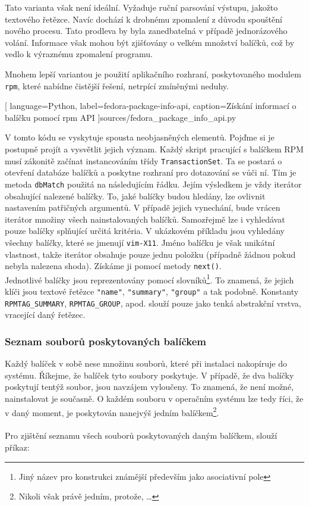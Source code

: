 \documentclass[
  field=inf,
  biblatex,
  glossaries,
  index
]{kidiplom}
\begin{document}
		Tato varianta však není ideální. Vyžaduje ruční parsování výstupu, jakožto textového řetězce. Navíc dochází k drobnému zpomalení z důvodu spouštění nového procesu. Tato prodleva by byla zanedbatelná v případě jednorázového volání. Informace však mohou být zjišťovány o velkém množství balíčků, což by vedlo k výraznému zpomalení programu.

		Mnohem lepší variantou je použití aplikačního rozhraní, poskytovaného modulem \texttt{rpm}, které nabídne čistější řešení, netrpící zmíněnými neduhy.

		\newpage
		
		[
			language=Python,
			label=fedora-package-info-api,
			caption={Získání informací o balíčku pomocí rpm API}
		]{sources/fedora_package_info_api.py}

		V tomto kódu se vyskytuje spousta neobjasněných elementů. Pojďme si je postupně projít a vysvětlit jejich význam. Každý skript pracující s balíčkem RPM musí zákonitě začínat instancováním třídy \texttt{TransactionSet}. Ta se postará o otevření databáze balíčků a poskytne rozhraní pro dotazování se vůči ní. Tím je metoda \texttt{dbMatch} použitá na následujícím řádku. Jejím výsledkem je vždy iterátor obsahující nalezené balíčky. To, jaké balíčky budou hledány, lze ovlivnit nastavením patřičných argumentů. V případě jejich vynechání, bude vrácen iterátor množiny všech nainstalovaných balíčků. Samozřejmě lze i vyhledávat pouze balíčky splňující určitá kritéria. V ukázkovém příkladu jsou vyhledány všechny balíčky, které se jmenují \texttt{vim-X11}. Jméno balíčku je však unikátní vlastnost, takže iterátor obsahuje pouze jednu položku (případně žádnou pokud nebyla nalezena shoda). Získáme ji pomocí metody \texttt{next()}.
		\\
		Jednotlivé balíčky jsou reprezentovány pomocí slovníků\footnote{Jiný název pro konstrukci známější především jako asociativní pole}. To znamená, že jejich klíči jsou textové řetězce \texttt{"name"}, \texttt{"summary"}, \texttt{"group"} a tak podobně. Konstanty \texttt{RPMTAG\_SUMMARY}, \texttt{RPMTAG\_GROUP}, apod. slouží pouze jako tenká abstrakční vrstva, vracející daný řetězec.

		\subsubsection{Seznam souborů poskytovaných balíčkem}
		Každý balíček v sobě nese množinu souborů, které při instalaci nakopíruje do systému. Říkejme, že balíček tyto soubory poskytuje. V případě, že dva balíčky poskytují tentýž soubor, jsou navzájem vyloučeny. To znamená, že není možné, nainstalovat je současně. O každém souboru v operačním systému lze tedy říci, že v daný moment, je poskytován nanejvýš jedním balíčkem\footnote{Nikoli však právě jedním, protože, \dots}.
		\\
		\\
		Pro zjištění seznamu všech souborů poskytovaných daným balíčkem, slouží příkaz:
\end{document}
